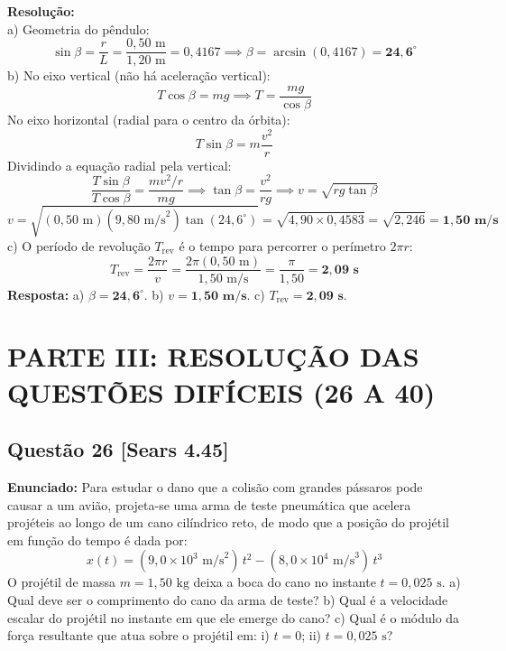 \documentclass[11pt,a4paper]{article}
\begin{document}
\noindent
\textbf{Resolução:}\\
a) Geometria do pêndulo:
\[ \sin\beta = \frac{r}{L} = \frac{0,50\text{ m}}{1,20\text{ m}} = 0,4167 \implies \beta = \arcsin(0,4167) = \mathbf{24,6^\circ} \]
b) No eixo vertical (não há aceleração vertical):
\[ T \cos\beta = mg \implies T = \frac{mg}{\cos\beta} \]
No eixo horizontal (radial para o centro da órbita):
\[ T \sin\beta = m \frac{v^2}{r} \]
Dividindo a equação radial pela vertical:
\[ \frac{T\sin\beta}{T\cos\beta} = \frac{m v^2 / r}{mg} \implies \tan\beta = \frac{v^2}{rg} \implies v = \sqrt{rg \tan\beta} \]
\[ v = \sqrt{(0,50\text{ m})(9,80\text{ m/s}^2)\tan(24,6^\circ)} = \sqrt{4,90 \times 0,4583} = \sqrt{2,246} = \mathbf{1,50\text{ m/s}} \]
c) O período de revolução $T_{\text{rev}}$ é o tempo para percorrer o perímetro $2\pi r$:
\[ T_{\text{rev}} = \frac{2\pi r}{v} = \frac{2\pi (0,50\text{ m})}{1,50\text{ m/s}} = \frac{\pi}{1,50} = \mathbf{2,09\text{ s}} \]
\textbf{Resposta:} a) $\beta = \mathbf{24,6^\circ}$. b) $v = \mathbf{1,50\text{ m/s}}$. c) $T_{\text{rev}} = \mathbf{2,09\text{ s}}$.

\newpage
\section*{PARTE III: RESOLUÇÃO DAS QUESTÕES DIFÍCEIS (26 A 40)}

\subsection*{Questão 26 [Sears 4.45]}
\textbf{Enunciado:} Para estudar o dano que a colisão com grandes pássaros pode causar a um avião, projeta-se uma arma de teste pneumática que acelera projéteis ao longo de um cano cilíndrico reto, de modo que a posição do projétil em função do tempo é dada por:
\[ x(t) = (9,0 \times 10^3\text{ m/s}^2)\,t^2 - (8,0 \times 10^4\text{ m/s}^3)\,t^3 \]
O projétil de massa $m = 1,50\text{ kg}$ deixa a boca do cano no instante $t = 0,025\text{ s}$. a) Qual deve ser o comprimento do cano da arma de teste? b) Qual é a velocidade escalar do projétil no instante em que ele emerge do cano? c) Qual é o módulo da força resultante que atua sobre o projétil em: i) $t = 0$; ii) $t = 0,025\text{ s}$?
\end{document}
